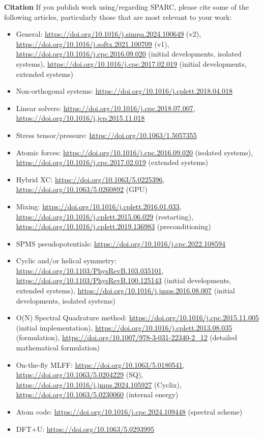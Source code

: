 \begin{frame}[allowframebreaks]{\textbf{Citation}} \label{Citation}
If you publish work using/regarding SPARC, please cite some of the following articles, particularly those that are most relevant to your work:
\begin{itemize}
    \item General: \url{https://doi.org/10.1016/j.simpa.2024.100649} (v2), \url{https://doi.org/10.1016/j.softx.2021.100709} (v1), \url{https://doi.org/10.1016/j.cpc.2016.09.020} (initial developments, isolated systems), \url{https://doi.org/10.1016/j.cpc.2017.02.019} (initial developments, extended systems)
    \item Non-orthogonal systems: \url{https://doi.org/10.1016/j.cplett.2018.04.018}
    \item Linear solvers: \url{https://doi.org/10.1016/j.cpc.2018.07.007}, \url{https://doi.org/10.1016/j.jcp.2015.11.018}
    \item Stress tensor/pressure: \url{https://doi.org/10.1063/1.5057355}
    \item Atomic forces: \url{https://doi.org/10.1016/j.cpc.2016.09.020} (isolated systems), \url{https://doi.org/10.1016/j.cpc.2017.02.019} (extended systems)
    \item Hybrid XC:
    \url{https://doi.org/10.1063/5.0225396}, \url{https://doi.org/10.1063/5.0260892} (GPU)
    \item Mixing: \url{https://doi.org/10.1016/j.cplett.2016.01.033}, \url{https://doi.org/10.1016/j.cplett.2015.06.029} (restarting), \url{https://doi.org/10.1016/j.cplett.2019.136983} (preconditioning)
    \item SPMS pseudopotentials: \url{https://doi.org/10.1016/j.cpc.2022.108594}
    \item Cyclic and/or helical symmetry:
    \url{https://doi.org/10.1103/PhysRevB.103.035101},
    \url{https://doi.org/10.1103/PhysRevB.100.125143} (initial developments, extended systems),
    \url{https://doi.org/10.1016/j.jmps.2016.08.007} (initial developments, isolated systems)
    \item O(N) Spectral Quadrature method:
    \url{https://doi.org/10.1016/j.cpc.2015.11.005} (initial implementation),
    \url{https://doi.org/10.1016/j.cplett.2013.08.035} (formulation),
    \url{https://doi.org/10.1007/978-3-031-22340-2_12} (detailed mathematical formulation)
    \item On-the-fly MLFF:
    \url{https://doi.org/10.1063/5.0180541}, \url{https://doi.org/10.1063/5.0204229} (SQ), \url{https://doi.org/10.1016/j.jmps.2024.105927} (Cyclix), \url{https://doi.org/10.1063/5.0230060} (internal energy)
    \item Atom code:
    \url{https://doi.org/10.1016/j.cpc.2024.109448} (spectral scheme)
    \item DFT+U:
    \url{https://doi.org/10.1063/5.0293995}
\end{itemize}
\end{frame}
  
